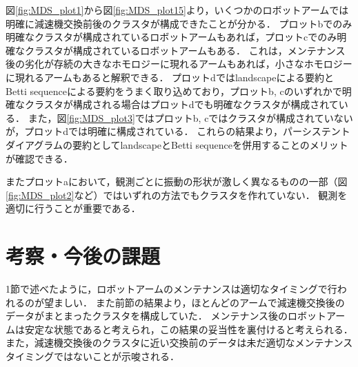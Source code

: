 \documentclass{jarticle}
\begin{document}
図\ref{fig:MDS_plot1}から図\ref{fig:MDS_plot15}より，いくつかのロボットアームでは明確に減速機交換前後のクラスタが構成できたことが分かる．
プロットbでのみ明確なクラスタが構成されているロボットアームもあれば，プロットcでのみ明確なクラスタが構成されているロボットアームもある．
これは，メンテナンス後の劣化が存続の大きなホモロジーに現れるアームもあれば，小さなホモロジーに現れるアームもあると解釈できる．
プロットdではlandscapeによる要約とBetti sequenceによる要約をうまく取り込めており，プロットb, cのいずれかで明確なクラスタが構成される場合はプロットdでも明確なクラスタが構成されている．
また，図\ref{fig:MDS_plot3}ではプロットb, cではクラスタが構成されていないが，プロットdでは明確に構成されている．
これらの結果より，パーシステントダイアグラムの要約としてlandscapeとBetti sequenceを併用することのメリットが確認できる．

またプロットaにおいて，観測ごとに振動の形状が激しく異なるものの一部（図\ref{fig:MDS_plot2}など）ではいずれの方法でもクラスタを作れていない．
観測を適切に行うことが重要である．

\section{考察・今後の課題}
1節で述べたように，ロボットアームのメンテナンスは適切なタイミングで行われるのが望ましい．
また前節の結果より，ほとんどのアームで減速機交換後のデータがまとまったクラスタを構成していた．
メンテナンス後のロボットアームは安定な状態であると考えられ，この結果の妥当性を裏付けると考えられる．
また，減速機交換後のクラスタに近い交換前のデータは未だ適切なメンテナンスタイミングではないことが示唆される．
\end{document}
